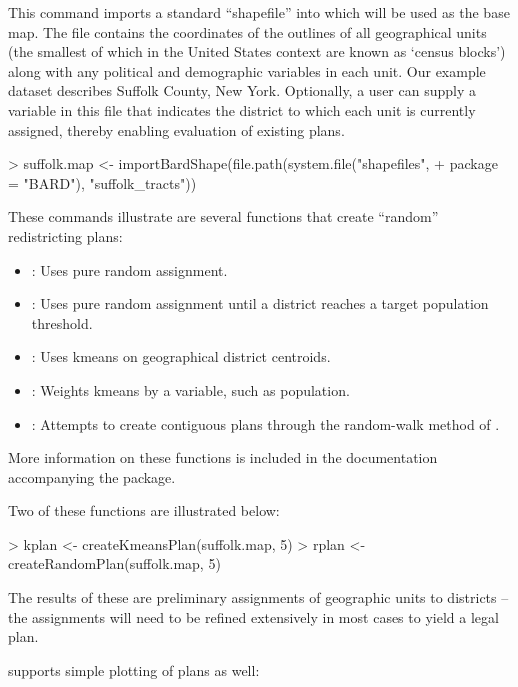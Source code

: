 \documentclass[article]{JSSstyle/jss}
\begin{document}
This command imports a standard ``shapefile'' into  which will be used as the base map.
The file contains the coordinates of the outlines of all geographical units (the smallest of which in the United States context are known as `census blocks') along with any political and demographic variables in each unit. Our example dataset describes Suffolk County, New York. Optionally, a user can supply a variable in this file that indicates the district to which each unit is currently assigned, thereby enabling evaluation of existing plans. 

\begin{Schunk}
\begin{Sinput}
> suffolk.map <- importBardShape(file.path(system.file("shapefiles", 
+     package = "BARD"), "suffolk_tracts"))
\end{Sinput}
\end{Schunk}

These commands illustrate are several  functions that create ``random'' redistricting plans:
\begin{itemize}
	\item {}: Uses pure random assignment.
	\item {}: Uses pure random assignment until a district reaches a target population threshold.
	\item {}: Uses kmeans on geographical district centroids.
	\item {}: Weights kmeans by a variable, such as population.
	\item {}: Attempts to create contiguous plans through the random-walk method of \citet{CirDarOro00}.
\end{itemize}
More information on these functions is included in the documentation accompanying the package.

Two of these functions are illustrated below:
\begin{Schunk}
\begin{Sinput}
> kplan <- createKmeansPlan(suffolk.map, 5)
> rplan <- createRandomPlan(suffolk.map, 5)
\end{Sinput}
\end{Schunk}

The results of these are preliminary assignments of geographic units to districts -- the assignments will need to be refined extensively in most cases to yield a legal plan. 

 supports simple plotting of plans as well:
\end{document}

